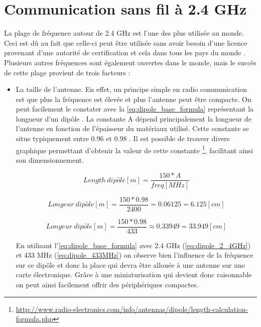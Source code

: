 \section{Communication sans fil à 2.4 GHz}
\label{sec_2_4_GHz}

La plage de fréquence autour de 2.4 GHz est l'une des plus utilisée au monde. Ceci est dû au fait que celle-ci peut être utilisée sans avoir besoin d'une licence provenant d'une autorité de certification et cela dans tous les pays du monde \cite{ISMbandW77:online}. Plusieurs autres fréquences sont également ouvertes dans le monde, mais le succès de cette plage provient de trois facteurs : 
\begin{itemize}
    \item La taille de l'antenne. En effet, un principe simple en radio communication est que plus la fréquence est élevée et plus l'antenne peut être compacte. On peut facilement le constater avec la \autoref{eq:dipole_base_formula} représentant la longueur d'un dipôle \cite{DipoleLe18:online}. La constante A dépend principalement la longueur de l'antenne en fonction de l'épaisseur du matériaux utilisé. Cette constante se situe typiquement entre 0.96 et 0.98 \cite{DipoleLe18:online}. Il est possible de trouver divers graphique permettant d'obtenir la valeur de cette constante \footnote{\url{http://www.radio-electronics.com/info/antennas/dipole/length-calculation-formula.php}}, facilitant ainsi son dimensionnement.
    
    
    \begin{equation}
    \label{eq:dipole_base_formula}
    Length \ dip\hat{o}le [m] = \frac{150 * A}{freq [MHz]}
    \end{equation}

    \begin{equation}
    \label{eq:dipole_2_4GHz}
    Longeur \ dip\hat{o}le [m] = \frac{150 * 0.98}{2400} = 0.06125 = 6.125 [cm]
    \end{equation}
    
    \begin{equation}
    \label{eq:dipole_433MHz}
    Longeur \ dip\hat{o}le [m] = \frac{150 * 0.98}{433} \approx 0.33949 = 33.949 [cm]
    \end{equation}
    
    En utilisant l'\autoref{eq:dipole_base_formula} avec 2.4 GHz (\autoref{eq:dipole_2_4GHz}) et 433 MHz (\autoref{eq:dipole_433MHz}) on observe bien l'influence de la fréquence sur ce dipôle et donc la place qui devra être allouée à une antenne sur une carte électronique. Grâce à une miniaturisation qui devient donc raisonnable on peut ainsi facilement offrir des périphériques compactes.
    

\end{itemize}
